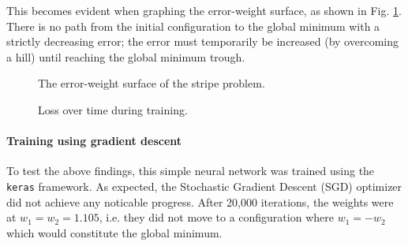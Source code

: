 \documentclass{article}
\begin{document}
This becomes evident when graphing the error-weight surface, as shown in Fig. \ref{fig:week6:stripe:errorsurface}. 
There is no path from the initial configuration to the global minimum with a strictly decreasing error; the error must temporarily be increased (by overcoming a hill) until reaching the global minimum trough.

\begin{figure}[h]
    \centering
    \caption{The error-weight surface of the stripe problem.}
    \label{fig:week6:stripe:errorsurface}
\end{figure}

\begin{wrapfigure}{R}{0.55\textwidth}
    \caption{Loss over time during training.}
    \label{fig:week6:stripe:trainingloss}
\end{wrapfigure}

\paragraph{Training using gradient descent}
To test the above findings, this simple neural network was trained using the \texttt{keras} framework. 
As expected, the Stochastic Gradient Descent (SGD) optimizer did not achieve any noticable progress.
After 20,000 iterations, the weights were at $w_1=w_2=1.105$, i.e. they did not move to a configuration where $w_1=-w_2$ which would constitute the global minimum. 
\end{document}
